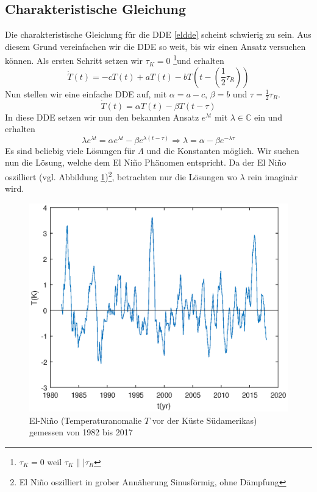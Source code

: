 \subsection{Charakteristische Gleichung}
Die charakteristische Gleichung für die DDE \eqref{eldde} scheint schwierig zu sein. 
Aus diesem Grund vereinfachen wir die DDE so weit, bis wir einen Ansatz versuchen können.
Als ersten Schritt setzen wir $\tau_K=0$ \footnote{$\tau_K=0$ weil $\tau_K \|| \tau_R$}und erhalten
\begin{equation}
	\dot{T}(t)=-cT(t)+aT(t)-bT(t-(\frac{1}{2}\tau_R))
\end{equation}
Nun stellen wir eine einfache DDE auf, mit $\alpha = a-c$, $\beta = b$ und $\tau = \frac{1}{2}\tau_R$.
\begin{equation}
	\dot{T}(t)=\alpha T(t)-\beta T(t-\tau)
\end{equation}
In diese DDE setzen wir nun den bekannten Ansatz $e^{\lambda t}$ mit $\lambda \in \mathbb{C}$ ein und erhalten
\begin{equation} \label{char_eldde}
	\lambda e^{\lambda t} = \alpha e^{\lambda t} - \beta e^{\lambda(t-\tau)} \Longrightarrow \lambda = \alpha-\beta e^{-\lambda \tau}
\end{equation}
Es sind beliebig viele Lösungen für $\Lambda$ und die Konstanten möglich.
Wir suchen nun die Lösung, welche dem El Niño Phänomen entspricht.
Da der El Niño oszilliert (vgl. Abbildung \ref{fig:elnino})\footnote{El Niño oszilliert in grober Annäherung Sinusförmig, ohne Dämpfung}, betrachten nur die Lösungen wo $\lambda$ rein imaginär wird.
\begin{figure}
	\centering
	\includegraphics{verzoegert/inp/figures/elnino.eps}
	\caption{El-Niño (Temperaturanomalie $T$ vor der Küste Südamerikas) gemessen von 1982 bis 2017}
	\label{fig:elnino}
\end{figure}
